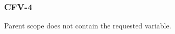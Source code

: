 \subsubsection{CFV-4}\label{sec:error_code_cfv_4}

Parent scope does not contain the requested variable.


